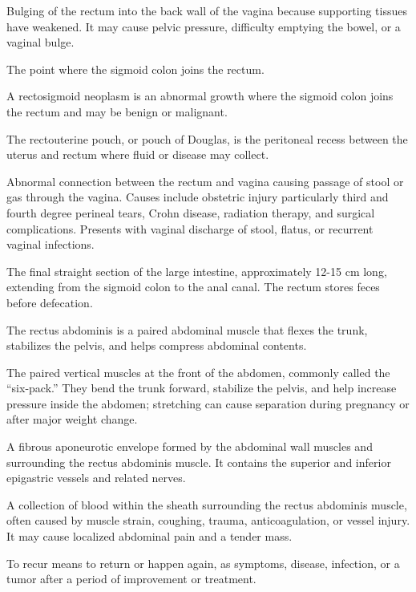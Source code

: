 Bulging of the rectum into the back wall of the vagina because supporting tissues have weakened. It may cause pelvic pressure, difficulty emptying the bowel, or a vaginal bulge.

 The point where the sigmoid colon joins the rectum.

 A rectosigmoid neoplasm is an abnormal growth where the sigmoid colon joins the rectum and may be benign or malignant.

 The rectouterine pouch, or pouch of Douglas, is the peritoneal recess between the uterus and rectum where fluid or disease may collect.

 Abnormal connection between the rectum and vagina causing passage of stool or gas
through the vagina. Causes include obstetric injury particularly third and fourth degree
perineal tears, Crohn disease, radiation therapy, and surgical complications. Presents
with vaginal discharge of stool, flatus, or recurrent vaginal infections.

 The final straight section of the large intestine, approximately 12-15 cm long,
extending from the sigmoid colon to the anal canal. The rectum stores feces before
defecation.

 The rectus abdominis is a paired abdominal muscle that flexes the trunk, stabilizes the pelvis, and helps compress abdominal contents.

 The paired vertical muscles at the front of the abdomen, commonly called the “six-pack.” They bend the trunk forward, stabilize the pelvis, and help increase pressure inside the abdomen; stretching can cause separation during pregnancy or after major weight change.

 A fibrous aponeurotic envelope formed by the abdominal wall muscles and surrounding the
rectus abdominis muscle. It contains the superior and inferior epigastric vessels and
related nerves.

 A collection of blood within the sheath surrounding the rectus abdominis muscle, often caused by muscle strain, coughing, trauma, anticoagulation, or vessel injury. It may cause localized abdominal pain and a tender mass.

 To recur means to return or happen again, as symptoms, disease, infection, or a tumor after a period of improvement or treatment.

